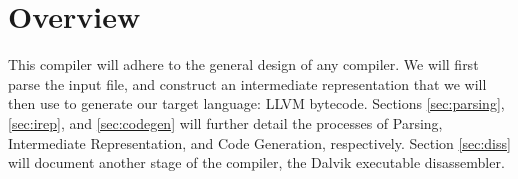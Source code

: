 \section{Overview}

This compiler will adhere to the general design of any compiler. We will first parse the input file, and construct an intermediate representation that we will then use to generate our target language: LLVM bytecode. Sections \ref{sec:parsing}, \ref{sec:irep}, and \ref{sec:codegen} will further detail the processes of Parsing, Intermediate Representation, and Code Generation, respectively. Section \ref{sec:diss} will document another stage of the compiler, the Dalvik executable disassembler.
